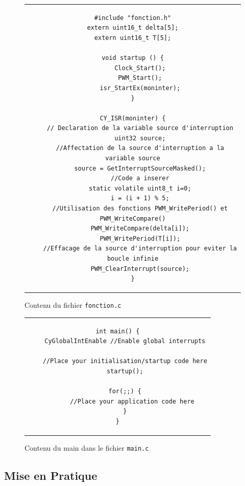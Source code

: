 \documentclass[11pt, openright]{book}
\begin{document}
\begin{figure}[ht!]
	\centering
	\begin{tabular}{c}
		\begin{lstlisting}
#include "fonction.h"
extern uint16_t delta[5];
extern uint16_t T[5];

void startup () {
	Clock_Start();
	PWM_Start();
	isr_StartEx(moninter);
}

CY_ISR(moninter) {
	// Declaration de la variable source d'interruption
	uint32 source;
	//Affectation de la source d'interruption a la variable source
	source = GetInterruptSourceMasked();
	//Code a inserer
	static volatile uint8_t i=0;
	i = (i + 1) % 5;
	//Utilisation des fonctions PWM_WritePeriod() et PWM_WriteCompare()
	PWM_WriteCompare(delta[i]);
	PWM_WritePeriod(T[i]);
	//Effacage de la source d'interruption pour eviter la boucle infinie
	PWM_ClearInterrupt(source);
}
			\end{lstlisting}
	\end{tabular}
	\caption{Contenu du fichier \texttt{fonction.c}}
\end{figure}

\begin{figure}[ht!]
	\hspace{-3.5cm}
	\begin{tabular}{c}
		\begin{lstlisting}
int main() {
	CyGlobalIntEnable //Enable global interrupts

	//Place your initialisation/startup code here
	startup();

	for(;;) {
		//Place your application code here
	}
}
			\end{lstlisting}
	\end{tabular}
	\caption{Contenu du main dans le fichier \texttt{main.c}}
\end{figure}


\newpage
\subsection{Mise en Pratique}
\end{document}
